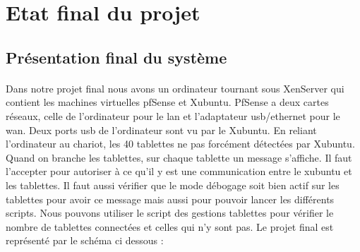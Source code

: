\documentclass[a4paper,12pt]{extarticle}
\begin{document}
\section{Etat final du projet}
\subsection{Présentation final du système}

\paragraph{}
Dans notre projet final nous avons un ordinateur tournant sous XenServer qui contient les machines virtuelles pfSense et Xubuntu. PfSense a deux cartes réseaux, celle de l’ordinateur pour le lan et l’adaptateur usb/ethernet pour le wan. Deux ports usb de l’ordinateur sont vu par le Xubuntu. En reliant l’ordinateur au chariot, les 40 tablettes ne pas forcément détectées par Xubuntu. Quand on branche les tablettes, sur chaque tablette un message s’affiche. 
Il faut l’accepter pour autoriser à ce qu’il y est une communication entre le xubuntu et les tablettes. Il faut aussi vérifier que le mode débogage soit bien actif sur les tablettes pour avoir ce message mais aussi pour pouvoir lancer les différents scripts. Nous pouvons utiliser le script des gestions tablettes pour vérifier le nombre de tablettes connectées et celles qui n’y sont pas. 
Le projet final est représenté par le schéma ci dessous :

\clearpage
\end{document}
